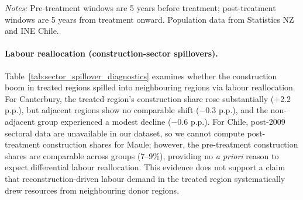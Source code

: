 \documentclass[12pt]{article}
\begin{document}
\begin{table}[H]
\centering
\caption{\textbf{Population flow diagnostics: pre- vs post-treatment growth rates}}
\label{tab:pop_flow_diagnostics}
\small
\setlength{\tabcolsep}{4pt}
\begin{minipage}{0.95\textwidth}\footnotesize\vspace{1ex}
\textit{Notes:} Pre-treatment windows are 5 years before treatment; post-treatment windows are 5 years from treatment onward. Population data from Statistics NZ and INE Chile.
\end{minipage}
\end{table}

\paragraph{Labour reallocation (construction-sector spillovers).}
Table~\ref{tab:sector_spillover_diagnostics} examines whether the construction boom in treated regions spilled into neighbouring regions via labour reallocation. For Canterbury, the treated region's construction share rose substantially (+2.2 p.p.), but adjacent regions show no comparable shift ($-0.3$ p.p.), and the non-adjacent group experienced a modest decline ($-0.6$ p.p.). For Chile, post-2009 sectoral data are unavailable in our dataset, so we cannot compute post-treatment construction shares for Maule; however, the pre-treatment construction shares are comparable across groups (7--9\%), providing no \emph{a priori} reason to expect differential labour reallocation. This evidence does not support a claim that reconstruction-driven labour demand in the treated region systematically drew resources from neighbouring donor regions.
\end{document}
